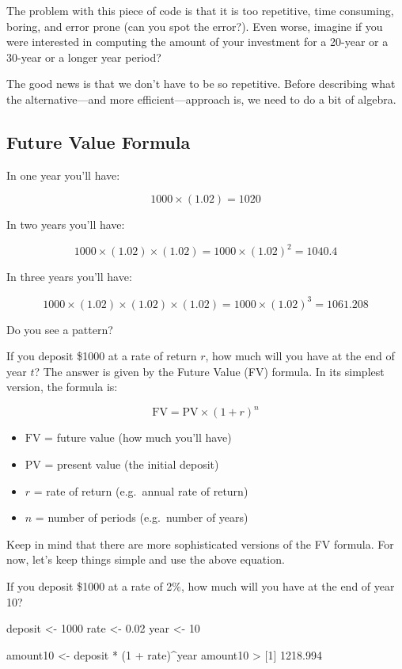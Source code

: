 \documentclass[
]{book}
\newenvironment{Shaded}{\begin{snugshade}}{\end{snugshade}}
\newcommand{\DecValTok}[1]{\textcolor[rgb]{0.00,0.00,0.81}{#1}}
\newcommand{\FloatTok}[1]{\textcolor[rgb]{0.00,0.00,0.81}{#1}}
\newcommand{\NormalTok}[1]{#1}
\newcommand{\OtherTok}[1]{\textcolor[rgb]{0.56,0.35,0.01}{#1}}
\newcommand{\SpecialCharTok}[1]{\textcolor[rgb]{0.00,0.00,0.00}{#1}}
\begin{document}
The problem with this piece of code is that it is too repetitive, time consuming,
boring, and error prone (can you spot the error?). Even worse, imagine if you
were interested in computing the amount of your investment for a 20-year or
a 30-year or a longer year period?

The good news is that we don't have to be so repetitive. Before describing what
the alternative---and more efficient---approach is, we need to do a bit of algebra.

\hypertarget{future-value-formula}{%
\subsection{Future Value Formula}\label{future-value-formula}}

In one year you'll have:

\[
1000 \times (1.02) = 1020
\]

In two years you'll have:

\[
1000 \times (1.02) \times (1.02) = 1000 \times (1.02)^2 = 1040.4
\]

In three years you'll have:

\[
1000 \times (1.02) \times (1.02) \times (1.02) = 1000 \times (1.02)^3 = 1061.208
\]

Do you see a pattern?

If you deposit \$1000 at a rate of return \(r\), how much will you have at the
end of year \(t\)? The answer is given by the Future Value (FV) formula. In its
simplest version, the formula is:

\[
\text{FV} = \text{PV} \times (1 + r)^n
\]

\begin{itemize}
\item
  \(\text{FV}\) = future value (how much you'll have)
\item
  \(\text{PV}\) = present value (the initial deposit)
\item
  \(r\) = rate of return (e.g.~annual rate of return)
\item
  \(n\) = number of periods (e.g.~number of years)
\end{itemize}

Keep in mind that there are more sophisticated versions of the FV formula.
For now, let's keep things simple and use the above equation.

If you deposit \$1000 at a rate of 2\%, how much will you have at the end of
year 10?

\begin{Shaded}
\begin{Highlighting}[]
\NormalTok{deposit }\OtherTok{\textless{}{-}} \DecValTok{1000}
\NormalTok{rate }\OtherTok{\textless{}{-}} \FloatTok{0.02}
\NormalTok{year }\OtherTok{\textless{}{-}} \DecValTok{10}

\NormalTok{amount10 }\OtherTok{\textless{}{-}}\NormalTok{ deposit }\SpecialCharTok{*}\NormalTok{ (}\DecValTok{1} \SpecialCharTok{+}\NormalTok{ rate)}\SpecialCharTok{\^{}}\NormalTok{year}
\NormalTok{amount10}
\SpecialCharTok{\textgreater{}}\NormalTok{ [}\DecValTok{1}\NormalTok{] }\FloatTok{1218.994}
\end{Highlighting}
\end{Shaded}
\end{document}
